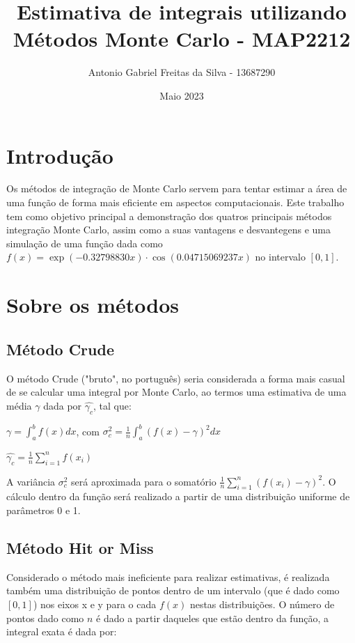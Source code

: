 \documentclass[a4paper]{article}
\title{Estimativa de integrais utilizando Métodos Monte Carlo - MAP2212}
\author{Antonio Gabriel Freitas da Silva - 13687290}
\date{Maio 2023}
\begin{document}
\maketitle

\section{Introdução}

Os métodos de integração de Monte Carlo servem para tentar estimar a área de uma função de forma mais eficiente em aspectos computacionais. Este trabalho tem como objetivo principal a demonstração dos quatros principais métodos integração Monte Carlo, assim como a suas vantagens e desvantegens e uma simulação de uma função dada como $f(x) = \exp{(-0.32798830x)}\cdot\cos{(0.04715069237x)}$ no intervalo $[0,1]$.

\section{Sobre os métodos}

\subsection{Método Crude}
O método Crude ("bruto", no português) seria considerada a forma mais casual de se calcular uma integral por Monte Carlo, ao termos uma estimativa de uma média $\gamma$ dada por $\hat{\gamma_{c}}$, tal que:

\begin{center}

$\gamma = \int_{a}^{b} f(x) dx$, com $\sigma_{c}^{2} = \frac{1}{n}\int_{a}^{b} (f(x) - \gamma)^{2} dx$

\vspace{0.5cm}

$\hat{\gamma_{c}} = \frac{1}{n}\sum_{i = 1}^{n} f(x_{i}) $

\end{center}

A variância $\sigma_{c}^{2}$ será aproximada para o somatório $\frac{1}{n}\sum_{i = 1}^{n} (f(x_{i}) - \gamma)^{2}$. O cálculo dentro da função será realizado a partir de uma distribuição uniforme de parâmetros 0 e 1.

\subsection{Método Hit or Miss}

Considerado o método mais ineficiente para realizar estimativas, é realizada também uma distribuição de pontos dentro de um intervalo (que é dado como $[0,1]$) nos eixos x e y para o cada $f(x)$ nestas distribuições. O número de pontos dado como $n$ é dado a partir daqueles que estão dentro da função, a integral exata é dada por:
\end{document}
